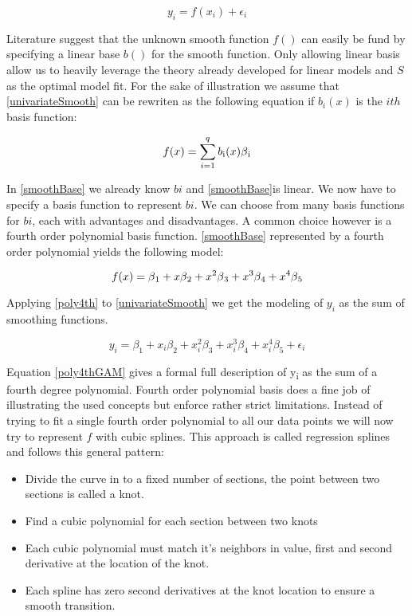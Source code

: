 \documentclass{article}
\begin{document}
    \begin{equation} \label{univariateSmooth} y_i = f(x_i) + \epsilon_i \end{equation}

    Literature suggest that the unknown smooth function $f()$ can easily be fund by specifying a linear base $b()$ for the smooth function. Only allowing linear basis allow us to heavily leverage the theory already developed for linear models and $S$ as the optimal model fit. For the sake of illustration we assume that \ref{univariateSmooth} can be rewriten as the following equation if $b_i(x)$ is the $ith$ basis function:

    \begin{equation} \label{smoothBase} f(x) = \sum_{i=1}^{q} b\textsubscript{i} (x) \beta \textsubscript{i} \end{equation}

    In \ref{smoothBase} we already know $bi$ and \ref{smoothBase}is linear. We now have to specify a basis function to represent $bi$. We can choose from many basis functions for $bi$, each with advantages and disadvantages. A common choice however is a fourth order polynomial basis function. \ref{smoothBase} represented by a fourth order polynomial yields the following model:

    \begin{equation} \label{poly4th} f(x) = \beta \textsubscript{1} + x\beta \textsubscript{2} + x^2\beta \textsubscript{3} + x^3\beta \textsubscript{4} + x^4\beta \textsubscript{5}  \end{equation}

    Applying \ref{poly4th} to \ref{univariateSmooth} we get the modeling of $y_i$ as the sum of smoothing functions.

    \begin{equation} \label{poly4thGAM}  y_i = \beta_1 + x_i\beta_2 + x_i^2\beta_3+ x_i^3\beta_4 + x_i^4\beta_5 + \epsilon_i \end{equation}

    Equation \ref{poly4thGAM} gives a formal full description of  y\textsubscript{i} as the sum of a fourth degree polynomial. Fourth order polynomial basis does a fine job of illustrating the used concepts but enforce rather strict limitations. Instead of trying to fit a single fourth order polynomial to all our data points we will now try to represent $f$ with cubic splines. This approach is called regression splines and follows this general pattern:

    \begin{itemize}

    \item Divide the curve in to a fixed number of sections, the point between two sections is called a knot.
    \item Find a cubic polynomial for each section between two knots
    \item Each cubic polynomial must match it's neighbors in value, first and second derivative at the location of the knot.
    \item Each spline has zero second derivatives at the knot location to ensure a smooth transition.

    \end{itemize}
\end{document}
